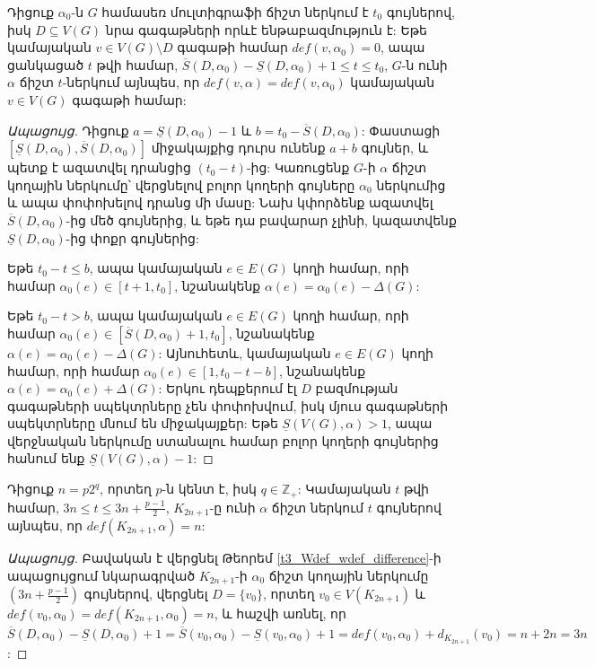 \begin{theorem}
\label{t3_middle_colors_def}
Դիցուք $\alpha_0$-ն $G$ համասեռ մուլտիգրաֆի ճիշտ ներկում է $t_0$ գույներով, իսկ $D \subseteq V(G)$ նրա գագաթների որևէ ենթաբազմություն է: Եթե կամայական $v \in V(G) \setminus D$ գագաթի համար $def(v,\alpha_0)=0$, ապա ցանկացած $t$ թվի համար, $\overline{S}(D,\alpha_0) - \underline{S}(D,\alpha_0) + 1 \leq t \leq t_0$, $G$-ն ունի $\alpha$ ճիշտ $t$-ներկում այնպես, որ $def(v,\alpha) = def(v,\alpha_0)$ կամայական $v\in V(G)$ գագաթի համար:
\end{theorem}
\begin{proof}[Ապացույց]
Դիցուք $a = \underline{S}(D,\alpha_0) - 1$ և $b = t_{0} - \overline{S}(D,\alpha_0)$: Փաստացի $[\underline{S}(D,\alpha_0),\overline{S}(D,\alpha_0)]$ միջակայքից դուրս ունենք $a+b$ գույներ, և պետք է ազատվել դրանցից $(t_0 - t)$-ից: Կառուցենք $G$-ի $\alpha$ ճիշտ կողային ներկումը՝ վերցնելով բոլոր կողերի գույները $\alpha_0$ ներկումից և ապա փոփոխելով դրանց մի մասը: Նախ կփորձենք ազատվել $\overline{S}(D,\alpha_0)$-ից մեծ գույներից, և եթե դա բավարար չլինի, կազատվենք $\underline{S}(D,\alpha_0)$-ից փոքր գույներից: 

Եթե $t_0 - t \leq b$, ապա կամայական $e\in E(G)$ կողի համար, որի համար $\alpha_0(e)\in \left[t + 1, t_0\right]$, նշանակենք $\alpha(e) = \alpha_0(e) - \Delta(G)$:

Եթե $t_0 - t > b$, ապա կամայական $e\in E(G)$ կողի համար, որի համար $\alpha_0(e)\in \left[\overline{S}(D, \alpha_0) + 1, t_0\right]$, նշանակենք $\alpha(e) = \alpha_0(e) - \Delta(G)$: Այնուհետև, կամայական $e\in E(G)$ կողի համար, որի համար $\alpha_0(e)\in \left[1, t_0 - t - b \right]$, նշանակենք $\alpha(e) = \alpha_0(e) + \Delta(G)$:
Երկու դեպքերում էլ $D$ բազմության գագաթների սպեկտրները չեն փոփոխվում, իսկ մյուս գագաթների սպեկտրները մնում են միջակայքեր: Եթե $\underline{S}(V(G), \alpha) > 1$, ապա վերջնական ներկումը ստանալու համար բոլոր կողերի գույներից հանում ենք  $\underline{S}(V(G), \alpha) - 1$:
\end{proof}


\begin{hide}
\begin{corollary}
\label{c3_complete_odd_colors}
Դիցուք $n=p2^q$, որտեղ $p$-ն կենտ է, իսկ $q \in \mathbb{Z}_+$: Կամայական $t$ թվի համար, $3n \leq t \leq 3n + \frac{p-1}{2}$, $K_{2n+1}$-ը ունի $\alpha$ ճիշտ ներկում $t$ գույներով այնպես, որ $def(K_{2n+1},\alpha)=n$:
\end{corollary}
\begin{proof}[Ապացույց] Բավական է վերցնել Թեորեմ \ref{t3_Wdef_wdef_difference}-ի ապացույցում նկարագրված $K_{2n+1}$-ի $\alpha_0$ ճիշտ կողային ներկումը $\left(3n + \frac{p-1}{2}\right)$ գույներով, վերցնել $D=\{v_0\}$, որտեղ $v_0\in V(K_{2n+1})$ և $def(v_0,\alpha_0)=def(K_{2n+1},\alpha_0)=n$, և հաշվի առնել, որ $\overline{S}(D,\alpha_0) - \underline{S}(D,\alpha_0) + 1=\overline{S}(v_0,\alpha_0) - \underline{S}(v_0,\alpha_0) + 1= def(v_0,\alpha_0)+d_{K_{2n+1}}(v_0) =n+2n =3n$:
\end{proof}
\end{hide}
